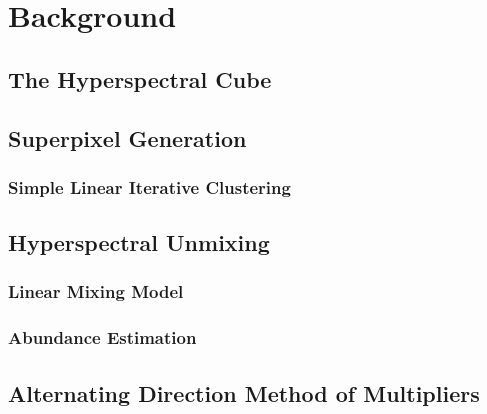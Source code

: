 \documentclass[10pt]{article}
\begin{document}
\clearpage
% 
% 
% 
% 
% 
\section{Background} \label{Background}

% 
\subsection{The Hyperspectral Cube} \label{Cube}


\subsection{Superpixel Generation} \label{Superpixel}

\subsubsection{Simple Linear Iterative Clustering} \label{SLIC}


\subsection{Hyperspectral Unmixing} \label{Unmixing Intro}

\subsubsection{Linear Mixing Model}\label{LMM}

\subsubsection{Abundance Estimation}\label{AE}


\subsection{Alternating Direction Method of Multipliers}\label{ADMM Intro}

%  
\end{document}
